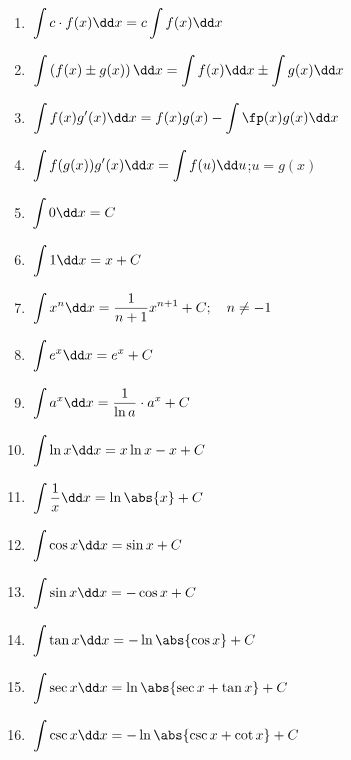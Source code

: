 \newcommand{\intRuleStrut}{\vphantom{\dfrac1{\sqrt{x^2}}}}%
\noindent{}%
\hspace{-1.5em}%
\parbox[t]{.37\linewidth}{%
\begin{enumerate}
\item $\intRuleStrut\ds\int c\cdot f(x)\dd x=c\int f(x)\dd x$
\item $\intRuleStrut\ds\int\left(f(x)\pm g(x)\right)\dd x=\int f(x)\dd x\pm\int g(x)\dd x$
\item $\intRuleStrut\ds\int f(x)g'(x)\dd x=f(x)g(x)-\int\fp(x)g(x)\dd x$
\item $\intRuleStrut\ds\int f(g(x))g'(x)\dd x=\int f(u)\dd u$;\quad $u=g(x)$
\item $\intRuleStrut\ds\int0\dd x=C$
\item $\intRuleStrut\ds\int1\dd x=x+C$
\item $\intRuleStrut\ds\int x^n\dd x=\frac1{n+1}x^{n+1}+C;\quad n\ne-1$
\item $\intRuleStrut\ds\int e^x\dd x=e^x+C$
\item $\intRuleStrut\ds\int a^x\dd x=\frac1{\ln a}\cdot a^x+C$
\item $\intRuleStrut\ds\int\ln x\dd x=x\ln x-x+C$
\item $\intRuleStrut\ds\int\frac1x\dd x=\ln \abs{x} + C$
\item $\intRuleStrut\ds\int\cos x\dd x=\sin x+C$
\item $\intRuleStrut\ds\int\sin x\dd x=-\cos x+C$
\item $\intRuleStrut\ds\int\tan x\dd x=-\ln \abs{\cos x}+C$
\item $\intRuleStrut\ds\int\sec x\dd x=\ln \abs{\sec x+\tan x}+C$
\item $\intRuleStrut\ds\int\csc x\dd x=-\ln \abs{\csc x+\cot x}+C$
\end{enumerate}}%
\hfill

